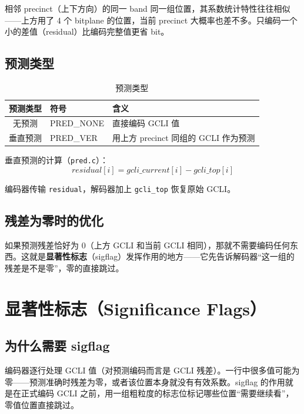 \begin{engineeringnote}
相邻 precinct（上下方向）的同一 band 同一组位置，其系数统计特性往往相似——上方用了 4 个 bitplane 的位置，当前 precinct 大概率也差不多。只编码一个小的差值（residual）比编码完整值更省 bit。
\end{engineeringnote}

\subsection{预测类型}

\begin{table}[H]
\centering
\caption{预测类型}
\begin{tabular}{@{}cll@{}}
\toprule
预测类型 & 符号 & 含义 \\
\midrule
无预测 & PRED\_NONE & 直接编码 GCLI 值 \\
垂直预测 & PRED\_VER & 用上方 precinct 同组的 GCLI 作为预测 \\
\bottomrule
\end{tabular}
\end{table}

垂直预测的计算（\texttt{pred.c}）：
\begin{equation}
\mathit{residual}[i] = \mathit{gcli\_current}[i] - \mathit{gcli\_top}[i]
\end{equation}

编码器传输 \texttt{residual}，解码器加上 \texttt{gcli\_top} 恢复原始 GCLI。

\subsection{残差为零时的优化}

如果预测残差恰好为 0（上方 GCLI 和当前 GCLI 相同），那就不需要编码任何东西。这就是\textbf{显著性标志}（sigflag）发挥作用的地方——它先告诉解码器``这一组的残差是不是零''，零的直接跳过。

\section{显著性标志（Significance Flags）}

\subsection{为什么需要 sigflag}

编码器逐行处理 GCLI 值（对预测编码而言是 GCLI 残差）。一行中很多值可能为零——预测准确时残差为零，或者该位置本身就没有有效系数。sigflag 的作用就是在正式编码 GCLI 之前，用一组粗粒度的标志位标记哪些位置``需要继续看''，零值位置直接跳过。

